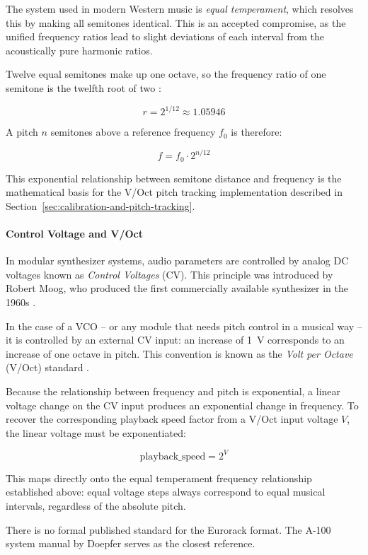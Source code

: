 The system used in modern Western music is \textit{equal temperament}, which resolves this by making all semitones identical. 
This is an accepted compromise, as the unified frequency ratios lead to slight deviations of each interval from the acoustically pure harmonic ratios.

Twelve equal semitones make up one octave, so the frequency ratio of one semitone is the twelfth root of two 
\cite[pp.~181-182]{wheelerScienceSound2014}:

\begin{equation}
r = 2^{1/12} \approx 1.05946
\end{equation}

A pitch $n$ semitones above a reference frequency $f_0$ is therefore:

\begin{equation}
f = f_0 \cdot 2^{n/12}
\end{equation}

This exponential relationship between semitone distance and frequency is the mathematical basis for the V/Oct pitch tracking implementation described in Section~\ref{sec:calibration-and-pitch-tracking}.

\paragraph{Control Voltage and V/Oct}

In modular synthesizer systems, audio parameters are controlled by analog DC voltages known as \textit{Control Voltages} (CV). 
This principle was introduced by Robert Moog, who produced the first commercially available synthesizer in the 1960s \cite{TechnicalDetailsA100}.

In the case of a \ac{VCO} -- or any module that needs pitch control in a musical way -- it is controlled by an external CV input: an increase of \qty{1}{V} corresponds to an increase of one octave in pitch. 
This convention is known as the \textit{Volt per Octave} (V/Oct) standard \cite{TechnicalDetailsA100}.

Because the relationship between frequency and pitch is exponential, a linear voltage change on the CV input produces an exponential change in frequency. 
To recover the corresponding playback speed factor from a V/Oct input voltage $V$, the linear voltage must be exponentiated:

\begin{equation}
\text{playback\_speed} = 2^{V}
\end{equation}

This maps directly onto the equal temperament frequency relationship established above: equal voltage steps always correspond to equal musical intervals, regardless of the absolute pitch.

There is no formal published standard for the Eurorack format. 
The A-100 system manual by Doepfer \cite{TechnicalDetailsA100} serves as the closest reference.